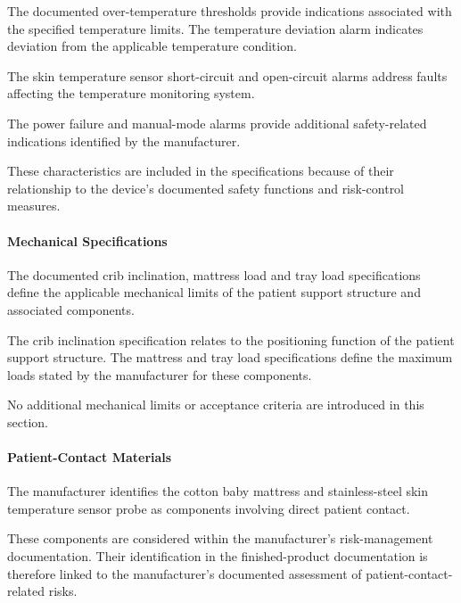 The documented over-temperature thresholds provide indications
associated with the specified temperature limits. The temperature
deviation alarm indicates deviation from the applicable temperature
condition.

The skin temperature sensor short-circuit and open-circuit alarms
address faults affecting the temperature monitoring system.

The power failure and manual-mode alarms provide additional
safety-related indications identified by the manufacturer.

These characteristics are included in the specifications because
of their relationship to the device's documented safety functions
and risk-control measures.


\paragraph{Mechanical Specifications}

The documented crib inclination, mattress load and tray load
specifications define the applicable mechanical limits of the
patient support structure and associated components.

The crib inclination specification relates to the positioning
function of the patient support structure. The mattress and tray
load specifications define the maximum loads stated by the
manufacturer for these components.

No additional mechanical limits or acceptance criteria are
introduced in this section.


\paragraph{Patient-Contact Materials}

The manufacturer identifies the cotton baby mattress and
stainless-steel skin temperature sensor probe as components
involving direct patient contact.

These components are considered within the manufacturer's
risk-management documentation. Their identification in the
finished-product documentation is therefore linked to the
manufacturer's documented assessment of patient-contact-related
risks.

